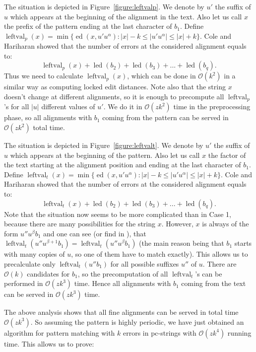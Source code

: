 \documentclass[runningheads]{llncs}
\DeclareMathOperator{\led}{led}
\DeclareMathOperator{\ed}{ed}
\DeclareMathOperator{\leftval}{leftval}
\begin{document}
\begin{mycases}
\item{The situation is depicted in Figure~\ref{figure:leftvalp}. We denote by $u'$ the suffix of $u$ which appears at the beginning of the alignment in the text. Also let us call $x$ the prefix of the pattern ending at the last character of $b_1$. Define $\leftval_p(x)=\min\{\ed(x,u'u^{\alpha}):|x|-k\leq |u'u^{\alpha}|\leq |x|+k\} $. Cole and Hariharan showed that the number of errors at the considered alignment equals to: $$\leftval_p(x)+\led(b_2)+\led(b_3)+...+\led(b_q).$$
Thus we need to calculate $\leftval_p(x)$, which can be done in $\mathcal{O}(k^2)$ in a similar way as computing locked edit distances. Note also that the string $x$ doesn't change at different alignments, so it is enough to precompute all $\leftval_p$'s for all $|u|$ different values of $u'$. We do it in $\mathcal{O}(zk^2)$ time in the preprocessing phase, so all alignments with $b_1$ coming from the pattern can be served in $\mathcal{O}(zk^2 )$ total time. 
 
 }
\item{The situation is depicted in Figure~\ref{figure:leftvalt}. We denote by $u'$ the suffix of $u$ which appears at the beginning of the pattern. Also let us call $x$ the factor of the text starting at the alignment position and ending at the last character of $b_1$. Define $\leftval_t(x)=\min\{\ed(x,u'u^{\alpha}):|x|-k\leq |u'u^{\alpha}|\leq |x|+k\} $. Cole and Hariharan showed that the number of errors at the considered alignment equals to:  $$\leftval_t(x)+\led(b_2)+\led(b_3)+...+\led(b_q).$$ 
Note that the situation now seems to be more complicated than in Case 1, because there are many possibilities for the string $x$. However, $x$ is always of the form $u''u^{\beta}b_1$ and one can see (or find in \cite{ColeHariharan}), that $\leftval_t(u''u^{\beta+1}b_1)=\leftval_t(u''u^{\beta}b_1)$ (the main reason being that $b_1$ starts with many copies of $u$, so one of them have to match exactly). This allows us to precalculate only $\leftval_t(u''b_1)$ for all possible suffixes $u''$ of $u$. There are $\mathcal{O}(k)$ candidates for $b_1$, so the precomputation of all $\leftval_t$'s can be performed in $\mathcal{O}(zk^3)$ time. Hence all alignments with $b_{1}$ coming from the text can be served in $\mathcal{O}(zk^3)$ time.

}
\end{mycases}

The above analysis shows that all fine alignments can be served in total time $\mathcal{O}(zk^3)$. So assuming the pattern is highly periodic, we have just obtained an algorithm for pattern matching with $k$ errors in pc-strings with $\mathcal{O}(zk^4)$ running time. This allows us to prove:
\end{document}
